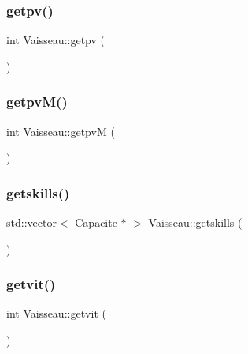 \mbox{\label{class_vaisseau_ae8e571f83be3f2bc1b961841f872265e}} 
\subsubsection{\texorpdfstring{getpv()}{getpv()}}
{\footnotesize\ttfamily int Vaisseau\+::getpv (\begin{DoxyParamCaption}{ }\end{DoxyParamCaption})}

\mbox{\label{class_vaisseau_aac552ebb8c5b199c0f0e38b1f1cd95af}} 
\subsubsection{\texorpdfstring{getpv\+M()}{getpvM()}}
{\footnotesize\ttfamily int Vaisseau\+::getpvM (\begin{DoxyParamCaption}{ }\end{DoxyParamCaption})}

\mbox{\label{class_vaisseau_a40cb016e98f0f928b32b3b4a47e27599}} 
\subsubsection{\texorpdfstring{getskills()}{getskills()}}
{\footnotesize\ttfamily std\+::vector$<$ \hyperlink{class_capacite}{Capacite} $\ast$ $>$ Vaisseau\+::getskills (\begin{DoxyParamCaption}{ }\end{DoxyParamCaption})}

\mbox{\label{class_vaisseau_a3ca57eda788c37034f9769d79f814dac}} 
\subsubsection{\texorpdfstring{getvit()}{getvit()}}
{\footnotesize\ttfamily int Vaisseau\+::getvit (\begin{DoxyParamCaption}{ }\end{DoxyParamCaption})}

